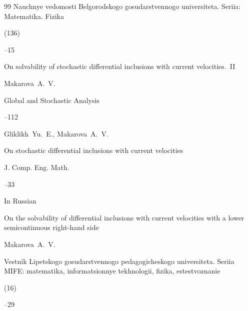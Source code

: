 \begin{thebibliography}{99}
\jour Nauchnye vedomosti Belgorodskogo gosudarstvennogo universiteta. Seriia: Matematika. Fizika



(136)

--15






\paper On solvability of stochastic differential inclusions with current velocities.~II 

\by Makarova~A.~V. 

\jour Global and Stochastic Analysis 




--112




\by Gliklikh~Yu.~E., Makarova~A.~V.

\paper On stochastic differential inclusions with current velocities

\jour J. Comp. Eng. Math.




--33







\lang In Russian

\paper On the solvability of differential inclusions with current velocities with a lower semicontinuous right-hand side

\by Makarova~A.~V.

\jour Vestnik Lipetskogo gosudarstvennogo pedagogicheskogo universiteta. Seriia MIFE: matematika, informatsionnye tekhnologii, fizika, estestvoznanie


(16)

--29






\end{thebibliography}
